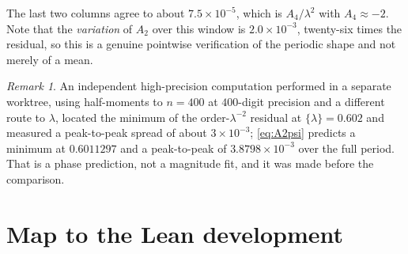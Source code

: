 \documentclass[11pt,oneside]{article}
\theoremstyle{definition}
\theoremstyle{remark}
\newtheorem{remark}[theorem]{Remark}
\begin{document}
The last two columns agree to about $7.5\times10^{-5}$, which is
$A_4/\lambda^2$ with $A_4\approx-2$.  Note that the \emph{variation} of $A_2$
over this window is $2.0\times10^{-3}$, twenty-six times the residual, so this
is a genuine pointwise verification of the periodic shape and not merely of a
mean.

\begin{remark}
An independent high-precision computation performed in a separate worktree,
using half-moments to $n=400$ at $400$-digit precision and a different route to
$\lambda$, located the minimum of the order-$\lambda^{-2}$ residual at
$\{\lambda\}=0.602$ and measured a peak-to-peak spread of about
$3\times10^{-3}$; \cref{eq:A2psi} predicts a minimum at $0.6011297$ and a
peak-to-peak of $3.8798\times10^{-3}$ over the full period.  That is a phase
prediction, not a magnitude fit, and it was made before the comparison.
\end{remark}

\section{Map to the Lean development}\label{sec:lean}
\end{document}
